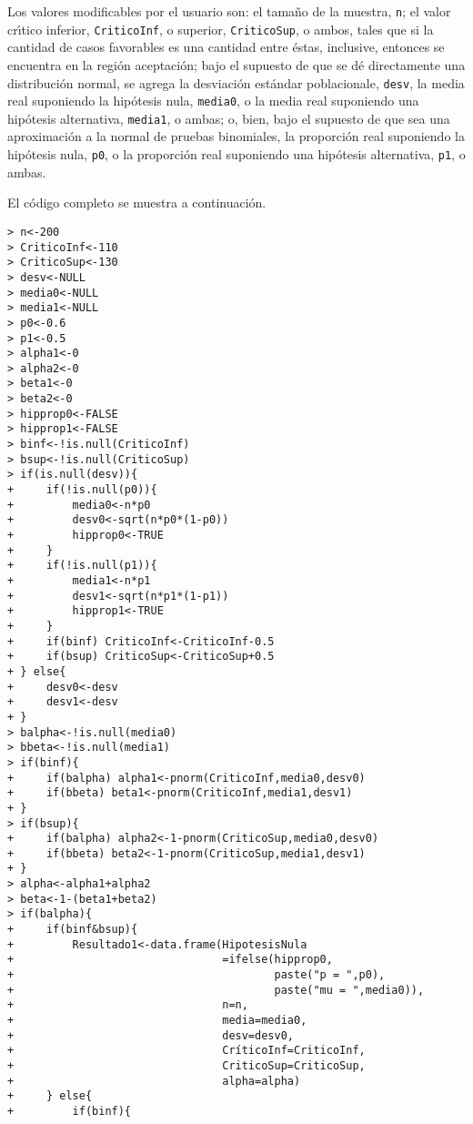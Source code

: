\begin{solucion}
 \par 
 Los valores modificables por el usuario son: el tama\~no de la muestra, \texttt{n}; el valor cr\'{\i}tico inferior, \texttt{CriticoInf}, o superior, \texttt{CriticoSup}, o ambos, tales que si la cantidad de casos favorables es una cantidad entre \'estas, inclusive, entonces se encuentra en la regi\'on aceptaci\'on; bajo el supuesto de que se d\'e directamente una distribuci\'on normal, se agrega la desviaci\'on est\'andar poblacionale, \texttt{desv}, la media real suponiendo la hip\'otesis nula, \texttt{media0}, o la media real suponiendo una hip\'otesis alternativa, \texttt{media1}, o ambas; o, bien, bajo el supuesto de que sea una aproximaci\'on a la normal de pruebas binomiales, la proporci\'on real suponiendo la hip\'otesis nula, \texttt{p0}, o la proporci\'on real suponiendo una hip\'otesis alternativa, \texttt{p1}, o ambas.
 \par 
 El c\'odigo completo se muestra a continuaci\'on.
 \begin{verbatim}
> n<-200
> CriticoInf<-110
> CriticoSup<-130
> desv<-NULL
> media0<-NULL
> media1<-NULL
> p0<-0.6
> p1<-0.5
> alpha1<-0
> alpha2<-0
> beta1<-0
> beta2<-0
> hipprop0<-FALSE
> hipprop1<-FALSE
> binf<-!is.null(CriticoInf)
> bsup<-!is.null(CriticoSup)
> if(is.null(desv)){
+     if(!is.null(p0)){
+         media0<-n*p0
+         desv0<-sqrt(n*p0*(1-p0))
+         hipprop0<-TRUE
+     }
+     if(!is.null(p1)){
+         media1<-n*p1
+         desv1<-sqrt(n*p1*(1-p1))
+         hipprop1<-TRUE
+     }
+     if(binf) CriticoInf<-CriticoInf-0.5
+     if(bsup) CriticoSup<-CriticoSup+0.5
+ } else{
+     desv0<-desv
+     desv1<-desv
+ }
> balpha<-!is.null(media0)
> bbeta<-!is.null(media1)
> if(binf){
+     if(balpha) alpha1<-pnorm(CriticoInf,media0,desv0)
+     if(bbeta) beta1<-pnorm(CriticoInf,media1,desv1)
+ }
> if(bsup){
+     if(balpha) alpha2<-1-pnorm(CriticoSup,media0,desv0)
+     if(bbeta) beta2<-1-pnorm(CriticoSup,media1,desv1)
+ }
> alpha<-alpha1+alpha2
> beta<-1-(beta1+beta2)
> if(balpha){
+     if(binf&bsup){
+         Resultado1<-data.frame(HipotesisNula
+                                =ifelse(hipprop0,
+                                        paste("p = ",p0),
+                                        paste("mu = ",media0)),
+                                n=n,
+                                media=media0,
+                                desv=desv0,
+                                CríticoInf=CriticoInf,
+                                CriticoSup=CriticoSup,
+                                alpha=alpha)
+     } else{
+         if(binf){

\end{verbatim}
\end{solucion}
